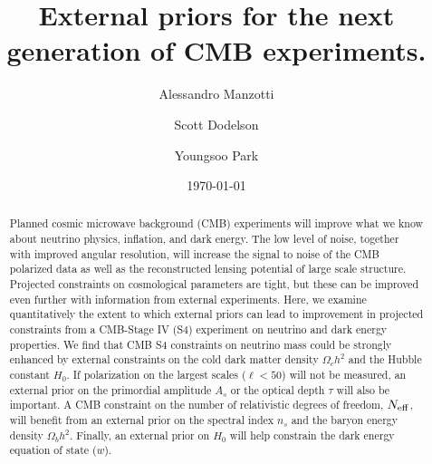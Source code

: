 \documentclass[aps,prd,reprint,superscriptaddress,nofootinbib,floatfix]{revtex4-1}
\begin{document}
\graphicspath{{./images/}}

\title{External priors for the next generation of CMB experiments.}
\author{Alessandro Manzotti}
\author{Scott Dodelson}


\author{Youngsoo Park}


\date{\today}
\begin{abstract}
Planned cosmic microwave background (CMB) experiments will improve what we know about neutrino physics, inflation, and dark energy. 
The low level of noise, together with improved angular resolution, will increase the signal to noise of the CMB polarized data as well as the reconstructed lensing potential of large scale structure. Projected constraints on cosmological parameters are tight, but these can be improved even further with information from external experiments. Here, we examine quantitatively the extent to which external priors can lead to improvement in projected constraints from a CMB-Stage IV (S4) experiment on neutrino and dark energy properties.
We find that CMB S4 constraints on neutrino mass could be strongly enhanced by external constraints on the cold dark matter density $\Omega_{c}h^{2}$ and the Hubble constant $H_{0}$. If polarization on the largest scales ($\ell<50$) will not be measured, an external prior on the primordial amplitude $A_{s}$ or the optical depth $\tau$ will also be important. A CMB constraint on the number of relativistic degrees of freedom, $N_{\rm eff}$, will benefit from an external prior on the spectral index $n_{s}$ and the baryon energy density $\Omega_{b}h^{2}$. Finally, an external prior on $H_{0}$ will help constrain the dark energy equation of state ($w$).
\end{abstract}

\pacs{}
\maketitle
\end{document}
